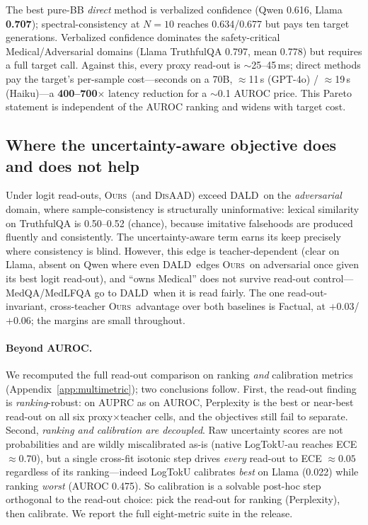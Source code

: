 \documentclass[11pt]{article}
\newcommand{\ours}{\textsc{Ours}}
\newcommand{\dald}{\textsc{DALD}}
\newcommand{\disaad}{\textsc{DisAAD}}
\newcommand{\best}[1]{\textbf{#1}}
\begin{document}
The best pure-BB \emph{direct} method is verbalized confidence (Qwen 0.616, Llama
\best{0.707}); spectral-consistency at $N{=}10$ reaches 0.634/0.677 but pays ten target
generations. Verbalized confidence dominates the safety-critical Medical/Adversarial
domains (Llama TruthfulQA 0.797, mean 0.778) but requires a full target call. Against
this, every proxy read-out is $\sim$25--45\,ms; direct methods pay the target's
per-sample cost---seconds on a 70B, $\approx$11\,s (GPT-4o) / $\approx$19\,s
(Haiku)---a \textbf{400--700$\times$} latency reduction for a $\sim$0.1 AUROC price. This
Pareto statement is independent of the AUROC ranking and widens with target cost.

\subsection{Where the uncertainty-aware objective does and does not help}

Under logit read-outs, \ours\ (and \disaad) exceed \dald\ on the \emph{adversarial}
domain, where sample-consistency is structurally uninformative: lexical similarity on
TruthfulQA is 0.50--0.52 (chance), because imitative falsehoods are produced fluently
and consistently. The uncertainty-aware term earns its keep precisely where consistency
is blind. However, this edge is teacher-dependent (clear on Llama, absent on Qwen where
even \dald\ edges \ours\ on adversarial once given its best logit read-out), and
``owns Medical'' does not survive read-out control---MedQA/MedLFQA go to \dald\ when it
is read fairly. The one read-out-invariant, cross-teacher \ours\ advantage over both
baselines is Factual, at $+0.03$/$+0.06$; the margins are small throughout.

\paragraph{Beyond AUROC.} We recomputed the full read-out comparison on ranking
\emph{and} calibration metrics (Appendix~\ref{app:multimetric}); two conclusions follow.
First, the read-out finding is \emph{ranking}-robust: on AUPRC as on AUROC, Perplexity is
the best or near-best read-out on all six proxy$\times$teacher cells, and the objectives
still fail to separate. Second, \emph{ranking and calibration are decoupled}. Raw
uncertainty scores are not probabilities and are wildly miscalibrated as-is (native
LogTokU-au reaches ECE $\approx 0.70$), but a single cross-fit isotonic step drives
\emph{every} read-out to ECE $\approx 0.05$ regardless of its ranking---indeed LogTokU
calibrates \emph{best} on Llama (0.022) while ranking \emph{worst} (AUROC 0.475). So
calibration is a solvable post-hoc step orthogonal to the read-out choice: pick the
read-out for ranking (Perplexity), then calibrate. We report the full eight-metric suite
in the release.
\end{document}
